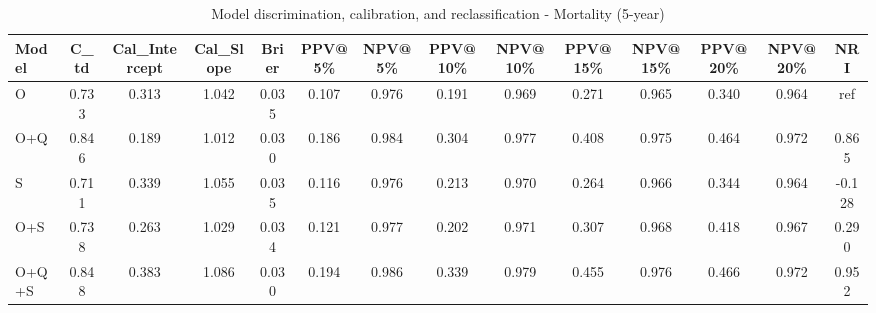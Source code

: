\begin{table}[htbp]
\centering
\small
\caption{Model discrimination, calibration, and reclassification - Mortality (5-year)}
\label{tab:perf_mortality_5y}
\begin{tabular}{lccccccccccccc}
\toprule
Model & C\_td & Cal\_Intercept & Cal\_Slope & Brier & PPV@5\% & NPV@5\% & PPV@10\% & NPV@10\% & PPV@15\% & NPV@15\% & PPV@20\% & NPV@20\% & NRI \\
\midrule
O & 0.733 & 0.313 & 1.042 & 0.035 & 0.107 & 0.976 & 0.191 & 0.969 & 0.271 & 0.965 & 0.340 & 0.964 & ref \\
O+Q & 0.846 & 0.189 & 1.012 & 0.030 & 0.186 & 0.984 & 0.304 & 0.977 & 0.408 & 0.975 & 0.464 & 0.972 & 0.865 \\
S & 0.711 & 0.339 & 1.055 & 0.035 & 0.116 & 0.976 & 0.213 & 0.970 & 0.264 & 0.966 & 0.344 & 0.964 & -0.128 \\
O+S & 0.738 & 0.263 & 1.029 & 0.034 & 0.121 & 0.977 & 0.202 & 0.971 & 0.307 & 0.968 & 0.418 & 0.967 & 0.290 \\
O+Q+S & 0.848 & 0.383 & 1.086 & 0.030 & 0.194 & 0.986 & 0.339 & 0.979 & 0.455 & 0.976 & 0.466 & 0.972 & 0.952 \\
\bottomrule
\end{tabular}
\end{table}